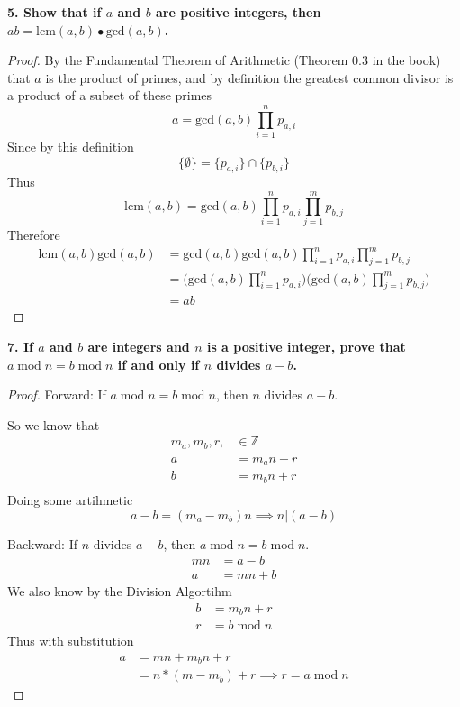 \textbf{5. Show that if $a$ and $b$ are positive integers, then $ab = \text{lcm}(a,b) \bullet \text{gcd}(a,b)$.}

\begin{proof}
By the Fundamental Theorem of Arithmetic (Theorem 0.3 in the book) that $a$ is the product of primes, and by definition the greatest common divisor is a product of a subset of these primes
\[ a = \text{gcd}(a,b)\prod_{i=1}^{n} p_{a,i}\]
Since by this definition
\[\{\emptyset\} = \{p_{a,i}\} \cap \{p_{b,i}\}  \]
Thus 
\[\text{lcm}(a,b)= \text{gcd}(a,b)\prod_{i=1}^{n} p_{a,i} \prod_{j=1}^{m} p_{b,j}\]
Therefore
\begin{align*}
\text{lcm}(a,b) \text{gcd}(a,b) &= \text{gcd}(a,b)\text{gcd}(a,b)\prod_{i=1}^{n} p_{a,i} \prod_{j=1}^{m} p_{b,j} \\
&= \big(\text{gcd}(a,b) \prod_{i=1}^{n} p_{a,i} \big)\big( \text{gcd}(a,b)\prod_{j=1}^{m} p_{b,j}\big) \\
&= ab
\end{align*}
\end{proof}

\textbf{7. If $a$ and $b$ are integers and $n$ is a positive integer, prove that $ a \;\mathrm{mod}\; n = b \;\mathrm{mod}\; n$ if and only if $n$ divides $a-b$.}

\begin{proof}
Forward: If $ a \;\mathrm{mod}\; n = b \;\mathrm{mod}\; n$, then $n$ divides $a-b$. 

So we know that
\begin{align*}
m_a, m_b, r, &\in \mathbb{Z} \\
a &= m_an + r \\
b &= m_bn + r \\
\end{align*}
Doing some artihmetic
\[ a - b = (m_a - m_b)n \implies n | (a - b)\]

Backward: If $n$ divides $a-b$, then $ a \;\mathrm{mod}\; n = b \;\mathrm{mod}\; n$.
\begin{align*}
mn &= a - b \\
a &= mn +b 
\end{align*}
We also know by the Division Algortihm
\begin{align*}
b &= m_bn + r \\
r &= b\;\mathrm{mod}\; n
\end{align*}
Thus with substitution
\begin{align*}
a &= mn + m_bn + r \\
&= n*(m - m_b) +r \implies r = a\;\mathrm{mod}\; n
\end{align*}
\end{proof}

